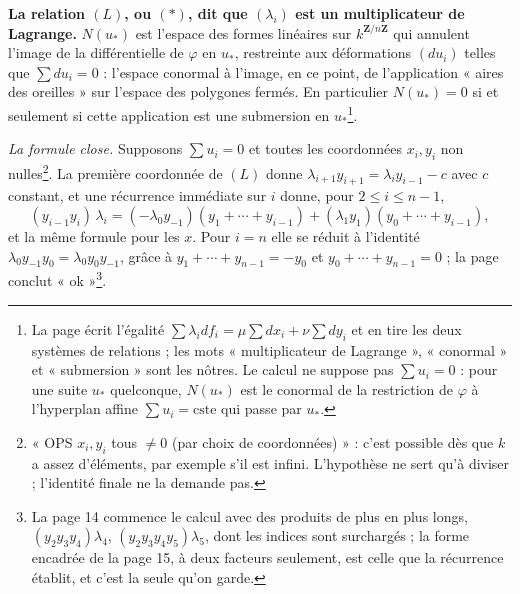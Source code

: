 \documentclass[11pt,a4paper]{article}
\begin{document}
\textbf{La relation $(L)$, ou $(\ast)$, dit que $(\lambda_i)$ est un
multiplicateur de Lagrange.} $N(u_*)$ est l'espace des formes linéaires sur
$k^{\mathbf{Z}/n\mathbf{Z}}$ qui annulent l'image de la différentielle de
$\varphi$ en $u_*$, restreinte aux déformations $(du_i)$ telles que
$\sum du_i = 0$ : l'espace conormal à l'image, en ce point, de l'application
« aires des oreilles » sur l'espace des polygones fermés. En particulier
$N(u_*) = 0$ si et seulement si cette application est une submersion en
$u_*$\footnote{La page écrit l'égalité
$\sum \lambda_i df_i = \mu \sum dx_i + \nu \sum dy_i$ et en tire les deux
systèmes de relations ; les mots « multiplicateur de Lagrange », « conormal »
et « submersion » sont les nôtres. Le calcul ne suppose pas $\sum u_i = 0$ :
pour une suite $u_*$ quelconque, $N(u_*)$ est le conormal de la restriction de
$\varphi$ à l'hyperplan affine $\sum u_i = \mathrm{cste}$ qui passe par $u_*$.}.

\emph{La formule close.} Supposons $\sum u_i = 0$ et toutes les coordonnées
$x_i, y_i$ non nulles\footnote{« OPS $x_i, y_i$ tous $\neq 0$ (par choix de
coordonnées) » : c'est possible dès que $k$ a assez d'éléments, par exemple
s'il est infini. L'hypothèse ne sert qu'à diviser ; l'identité finale ne la
demande pas.}. La première coordonnée de $(L)$ donne
$\lambda_{i+1} y_{i+1} = \lambda_i y_{i-1} - c$ avec $c$ constant, et une
récurrence immédiate sur $i$ donne, pour $2 \leqslant i \leqslant n-1$,
\[
  (y_{i-1} y_i)\, \lambda_i = (-\lambda_0 y_{-1})(y_1 + \cdots + y_{i-1})
  + (\lambda_1 y_1)(y_0 + \cdots + y_{i-1}) ,
\]
et la même formule pour les $x$. Pour $i = n$ elle se réduit à l'identité
$\lambda_0 y_{-1} y_0 = \lambda_0 y_0 y_{-1}$, grâce à
$y_1 + \cdots + y_{n-1} = -y_0$ et $y_0 + \cdots + y_{n-1} = 0$ ; la page
conclut « ok »\footnote{La page 14 commence le calcul avec des produits de
plus en plus longs, $(y_2 y_3 y_4)\lambda_4$, $(y_2 y_3 y_4 y_5)\lambda_5$,
dont les indices sont surchargés ; la forme encadrée de la page 15, à deux
facteurs seulement, est celle que la récurrence établit, et c'est la seule
qu'on garde.}.
\end{document}
